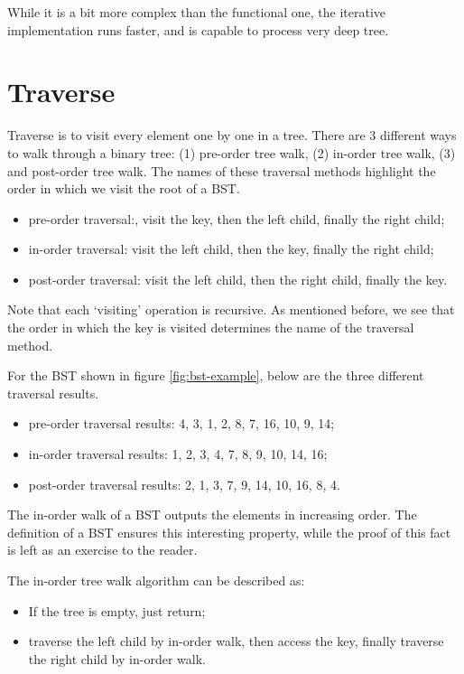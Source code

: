 \documentclass{article}
\begin{document}
While it is a bit more complex than the functional one, the iterative implementation runs faster, and is capable to process very deep tree.

\section{Traverse}

Traverse is to visit every element one by one in a tree. There are 3 different ways to walk through a binary tree: (1) pre-order tree walk, (2) in-order tree walk, (3) and post-order tree walk. The names of these traversal methods
highlight the order in which we visit the root of a BST.

\begin{itemize}
\item pre-order traversal:, visit the key, then the left child, finally the right child;
\item in-order traversal: visit the left child, then the key, finally the right child;
\item post-order traversal: visit the left child, then the right child, finally the key.
\end{itemize}

  

Note that each `visiting' operation is recursive. As mentioned before, we see that the order in which
the key is visited determines the name of the traversal method.

For the BST shown in figure \ref{fig:bst-example}, below
are the three different traversal results.

\begin{itemize}
\item pre-order traversal results: 4, 3, 1, 2, 8, 7, 16, 10, 9, 14;
\item in-order traversal results: 1, 2, 3, 4, 7, 8, 9, 10, 14, 16;
\item post-order traversal results: 2, 1, 3, 7, 9, 14, 10, 16, 8, 4.
\end{itemize}

The in-order walk of a BST outputs the elements in increasing order. The definition
of a BST ensures this interesting property, while the proof of this fact is left as an exercise to the reader.

The in-order tree walk algorithm can be described as:
\begin{itemize}
\item If the tree is empty, just return;
\item traverse the left child by in-order walk, then access the key,
finally traverse the right child by in-order walk.
\end{itemize}
\end{document}
